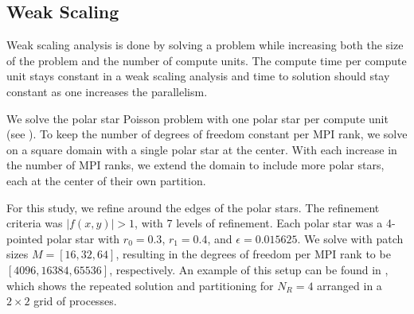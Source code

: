 
\subsection{Weak Scaling}
\label{sub:weak-scaling}

Weak scaling analysis is done by solving a problem while increasing both the size of the problem and the number of compute units. The compute time per compute unit stays constant in a weak scaling analysis and time to solution should stay constant as one increases the parallelism.

We solve the polar star Poisson problem with one polar star per compute unit (see ). To keep the number of degrees of freedom constant per MPI rank, we solve on a square domain with a single polar star at the center. With each increase in the number of MPI ranks, we extend the domain to include more polar stars, each at the center of their own partition.

For this study, we refine around the edges of the polar stars. The refinement criteria was $|f(x,y)| > 1$, with 7 levels of refinement. Each polar star was a 4-pointed polar star with $r_0 = 0.3$, $r_1 = 0.4$, and $\epsilon = 0.015625$. We solve with patch sizes $M = [16, 32, 64]$, resulting in the degrees of freedom per MPI rank to be $[4096, 16384, 65536]$, respectively. An example of this setup can be found in , which shows the repeated solution and partitioning for $N_R = 4$ arranged in a $2 \times 2$ grid of processes.

